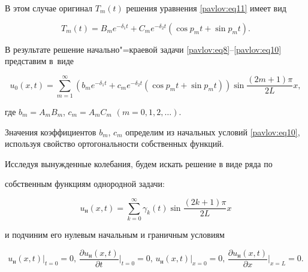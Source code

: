 В этом случае оригинал $T_m (t)$ решения уравнения \eqref{pavlov:eq11} имеет вид

\[

T_m (t)=B_m e^{-\delta _1 t}+C_m e^{-\delta _2 t}( \cos p_m t+\sin p_m t).

\]

В результате решение начально"=краевой задачи \eqref{pavlov:eq8}--\eqref{pavlov:eq10} представим в~виде

\begin{equation}

\label{pavlov:eq17}

u_0 (x,t)=\sum\limits_{m=1}^\infty \left( b_m e^{-\delta _1 t}+c_m

e^{-\delta _2 t}\left(\cos p_m t+\sin p_m t \right)\right )  \sin \frac{(2m+1)\pi }{2L}x ,

\end{equation}

где $b_m =A_m B_m$, $c_m =A_m C_m$ $(m=0, 1, 2, \ldots)$.

Значения коэффициентов $b_m$, $c_m$ определим из начальных условий \eqref{pavlov:eq10}, используя свойство ортогональности собственных функций.



Исследуя вынужденные колебания, будем искать решение в виде ряда по

собственным функциям однородной задачи:

\begin{equation}

\label{pavlov:eq18}

u_\text{н} (x,t)=\sum\limits_{k=0}^\infty \gamma _k (t)\sin \frac{( 2k+1 )\pi }{2L}x

\end{equation}

и подчиним его нулевым начальным и граничным условиям

\begin{equation}

\label{pavlov:eq19}

u_\text{н} (x,t) \Big |_{t=0} =0, \,

\frac{\partial u_\text{н} (x,t)}{\partial t} \Big|_{t=0} =0,

\,

u_\text{н} (x,t) \Big |_{x=0} =0,

\,

\frac{\partial u_\text{н} (x,t)}{\partial x}\Big|_{x=L}=0.

\end{equation}

